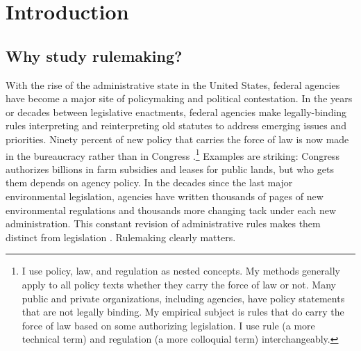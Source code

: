 \section{Introduction}
\subsection{Why study rulemaking?}
With the rise of the administrative state in the United States, federal agencies have become a major site of policymaking and political contestation. In the years or decades between legislative enactments, federal agencies make legally-binding rules interpreting and reinterpreting old statutes to address emerging issues and priorities. Ninety percent of new policy that carries the force of law is now made in the bureaucracy rather than in Congress \citep{West2013WhoControl}.\footnote{I use policy, law, and regulation as nested concepts. My methods generally apply to all policy texts whether they carry the force of law or not. Many public and private organizations, including agencies, have policy statements that are not legally binding. My empirical subject is rules that do carry the force of law based on some authorizing legislation. I use rule (a more technical term) and regulation (a more colloquial term) interchangeably.}
Examples are striking: %
Congress authorizes billions in farm subsidies and leases for public lands, but who gets them depends on agency policy. In the decades since the last major environmental legislation, agencies have written thousands of pages of new environmental regulations and thousands more changing tack under each new administration. This constant revision of administrative rules makes them distinct from legislation \citep{Wagner2017DynamicRulemaking}.
Rulemaking clearly matters.

